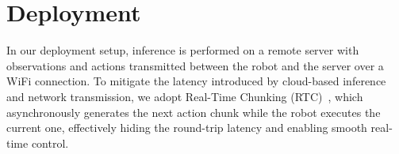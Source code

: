 \section{Deployment}
\label{sec:deployment}
In our deployment setup, inference is performed on a remote server with observations and actions transmitted between the robot and the server over a WiFi connection. To mitigate the latency introduced by cloud-based inference and network transmission, we adopt Real-Time Chunking (RTC)~\citep{black2026real}, which asynchronously generates the next action chunk while the robot executes the current one, effectively hiding the round-trip latency and enabling smooth real-time control.

